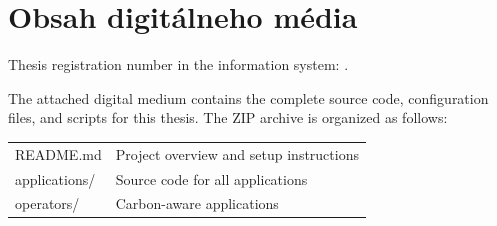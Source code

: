 \clearpage
\section{Obsah digitálneho média}
\renewcommand{\thepage}{D-\arabic{page}}
\setcounter{page}{1}
\makeatletter
\def\ps@specialappendix{%
  \def\@oddhead{}%
  \def\@evenhead{}%
  \def\@oddfoot{\hfil D-\arabic{page}\hfil}%
  \def\@evenfoot{\hfil D-\arabic{page}\hfil}%
}
\makeatother
\pagestyle{specialappendix}
\thispagestyle{specialappendix}
Thesis registration number in the information system: \FIITevidenceNumber.

The attached digital medium contains the complete source code, configuration files, and scripts for this thesis. The ZIP archive is organized as follows:

\begin{tabular}{@{}p{}p{}@{}}
\ttfamily README.md & Project overview and setup instructions \\[0.5em]
\ttfamily applications/ & Source code for all applications \\
\ttfamily \hspace{0.5cm} operators/ & Carbon-aware applications \\

\end{tabular}
\clearpage
\thispagestyle{specialappendix}